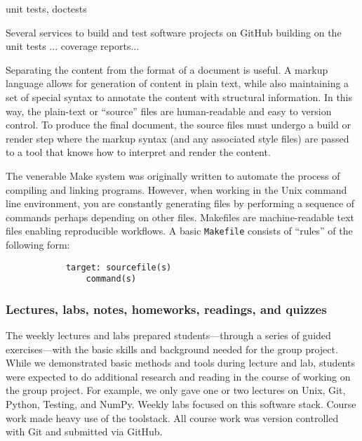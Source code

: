 unit tests, doctests


Several services to build and test software projects on GitHub 
building on the unit tests ...
coverage reports...

Separating the content from the format of a document is useful.
A markup language allows for generation of content in plain text, while also
maintaining a set of special syntax to annotate the content with structural
information.
In this way, the plain-text or ``source'' files are human-readable and easy to
version control.
To produce the final document, the source files must undergo a build or render
step where the markup syntax (and any associated style files) are passed to a
tool that knows how to interpret and render the content.


The venerable Make system was originally written to automate the process
of compiling and linking programs.
However, when working in the Unix command line environment, you are constantly
generating files by performing a sequence of commands perhaps depending on
other files.
Makefiles are machine-readable text files enabling reproducible workflows.
A basic \texttt{Makefile} consists of ``rules'' of the following form:
\begin{verbatim}
            target: sourcefile(s)
                command(s)
\end{verbatim}

\subsubsection{Lectures, labs, notes, homeworks, readings, and quizzes}

The weekly lectures and labs prepared students---through a
series of guided exercises---with the basic skills and
background needed for the group project.
While we demonstrated basic methods and tools during lecture and lab,
students were expected to do additional research and reading in the course
of working on the group project.
For example, we only gave one or two lectures on Unix, Git, Python, Testing, and NumPy.
Weekly labs focused on this software stack.
Course work made heavy use of the toolstack.
All course work was version controlled with Git and submitted via GitHub. 

